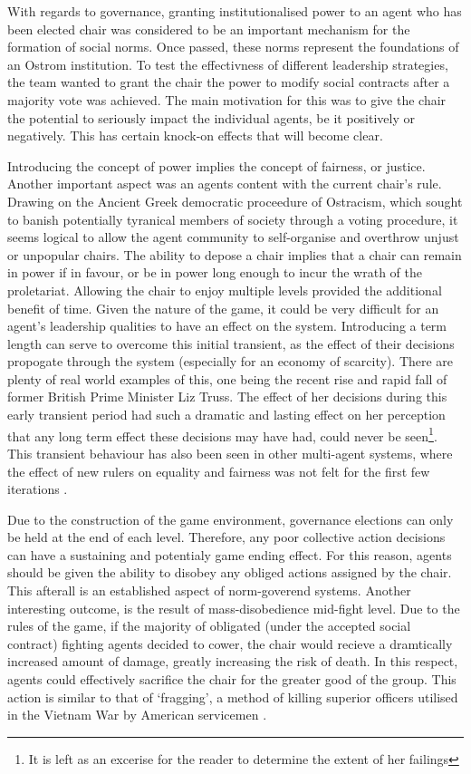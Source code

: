 With regards to governance, granting institutionalised power to an agent who has been elected chair was considered to be an important mechanism for the formation of social norms. Once passed, these norms represent the foundations of an Ostrom institution. To test the effectivness of different leadership strategies, the team wanted to grant the chair the power to modify social contracts after a majority vote was achieved. The main motivation for this was to give the chair the potential to seriously impact the individual agents, be it positively or negatively. This has certain knock-on effects that will become clear. 

Introducing the concept of power implies the concept of fairness, or justice. Another important aspect was an agents content with the current chair's rule. Drawing on the Ancient Greek democratic proceedure of Ostracism, which sought to banish potentially tyranical members of society through a voting procedure, it seems logical to allow the agent community to self-organise and overthrow unjust or unpopular chairs. The ability to depose a chair implies that a chair can remain in power if in favour, or be in power long enough to incur the wrath of the proletariat. Allowing the chair to enjoy multiple levels provided the additional benefit of time. Given the nature of the game, it could be very difficult for an agent's leadership qualities to have an effect on the system. Introducing a term length can serve to overcome this initial transient, as the effect of their decisions propogate through the system (especially for an economy of scarcity). There are plenty of real world examples of this, one being the recent rise and rapid fall of former British Prime Minister Liz Truss. The effect of her decisions during this early transient period had such a dramatic and lasting effect on her perception that any long term effect these decisions may have had, could never be seen\footnote{It is left as an excerise for the reader to determine the extent of her failings}. This transient behaviour has also been seen in other multi-agent systems, where the effect of new rulers on equality and fairness was not felt for the first few iterations \cite{Kirka2018}. 

Due to the construction of the game environment, governance elections can only be held at the end of each level. Therefore, any poor collective action decisions can have a sustaining and potentialy game ending effect. For this reason, agents should be given the ability to disobey any obliged actions assigned by the chair. This afterall is an established aspect of norm-goverend systems. Another interesting outcome, is the result of mass-disobedience mid-fight level. Due to the rules of the game, if the majority of obligated (under the accepted social contract) fighting agents decided to cower, the chair would recieve a dramtically increased amount of damage, greatly increasing the risk of death. In this respect, agents could effectively sacrifice the chair for the greater good of the group. This action is similar to that of `fragging', a method of killing superior officers utilised in the Vietnam War by American servicemen \cite{frag}.

